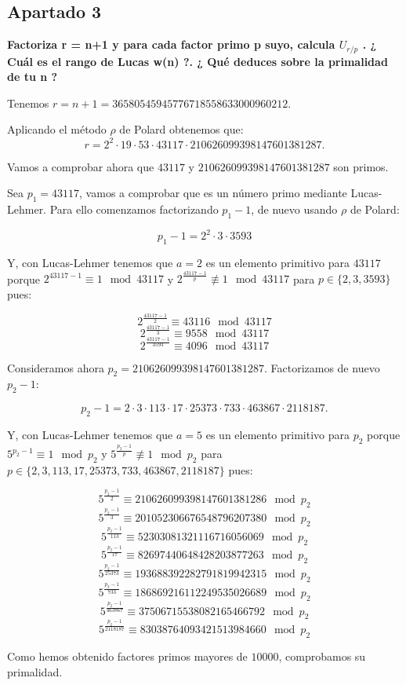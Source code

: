\documentclass[a4paper]{article}
\begin{document}
\subsection{Apartado 3}

\textbf{Factoriza r = n+1 y para cada factor primo p suyo, calcula $U_{r/p}$ . ¿ Cuál es el rango de Lucas w(n) ?. ¿ Qué deduces sobre la primalidad de tu n ?}

Tenemos $r=n+1=36580545945776718558633000960212$.

Aplicando el método $\rho$ de Polard obtenemos que:
$$r=2^2\cdot 19\cdot 53\cdot 43117\cdot 210626099398147601381287.$$

Vamos a comprobar ahora que $43117$ y $210626099398147601381287$ son primos.

Sea $p_1=43117$, vamos a comprobar que es un número primo mediante Lucas-Lehmer. Para ello comenzamos factorizando $p_1-1$, de nuevo usando $\rho$ de Polard:

$$p_1-1=2^2\cdot 3\cdot 3593$$

Y, con Lucas-Lehmer tenemos que $a=2$ es un elemento primitivo para $43117$ porque $2^{43117-1}\equiv 1\mod 43117$ y $2^{\frac{43117-1}{p}}\not\equiv 1\mod 43117 $ para $p\in\{2,3,3593\}$ pues:

$$2^{\frac{43117-1}{2}}\equiv 43116\mod 43117$$
$$2^{\frac{43117-1}{3}}\equiv 9558\mod 43117$$
$$2^{\frac{43117-1}{3593}}\equiv 4096\mod 43117$$

Consideramos ahora $p_2=210626099398147601381287$. Factorizamos de nuevo $p_2-1$:

$$p_2-1=2\cdot 3\cdot 113\cdot 17\cdot 25373\cdot 733\cdot 463867\cdot 2118187.$$

Y, con Lucas-Lehmer tenemos que $a=5$ es un elemento primitivo para $p_2$ porque $5^{p_2-1}\equiv 1\mod p_2$ y $5^{\frac{p_2-1}{p}}\not\equiv 1\mod p_2 $ para $p\in\{2, 3, 113, 17, 25373, 733, 463867, 2118187\}$ pues:

$$5^{\frac{p_2-1}{2}}\equiv 210626099398147601381286 \mod p_2$$
$$5^{\frac{p_2-1}{3}}\equiv 201052306676548796207380 \mod p_2$$
$$5^{\frac{p_2-1}{113}}\equiv 52303081321116716056069 \mod p_2$$
$$5^{\frac{p_2-1}{17}}\equiv 82697440648428203877263 \mod p_2$$
$$5^{\frac{p_2-1}{25373}}\equiv 193688392282791819942315 \mod p_2$$
$$5^{\frac{p_2-1}{733}}\equiv 186869216112249535026689 \mod p_2$$
$$5^{\frac{p_2-1}{463867}}\equiv 37506715538082165466792 \mod p_2$$
$$5^{\frac{p_2-1}{2118187}}\equiv 83038764093421513984660 \mod p_2$$

Como hemos obtenido factores primos mayores de $10000$, comprobamos su primalidad.
\end{document}
